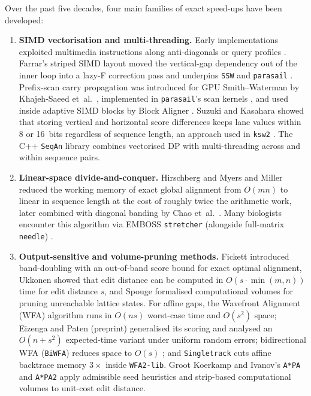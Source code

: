 \documentclass[11pt,a4paper]{article}
\begin{document}
Over the past five decades, four main families of exact speed-ups have been developed:
\begin{enumerate}
  \item \textbf{SIMD vectorisation and multi-threading.} Early implementations exploited multimedia instructions along anti-diagonals \citep{wozniak1997using} or query profiles \citep{rognes2000sixfold}. Farrar's striped SIMD layout \citep{farrar2007striped} moved the vertical-gap dependency out of the inner loop into a lazy-F correction pass and underpins \texttt{SSW} \citep{zhao2013ssw,sswrepo} and \texttt{parasail} \citep{daily2016parasail}. Prefix-scan carry propagation was introduced for GPU Smith--Waterman by Khajeh-Saeed et~al.~\citep{khajehsaeed2010acceleration}, implemented in \texttt{parasail}'s scan kernels \citep{daily2016parasail}, and used inside adaptive SIMD blocks by Block Aligner \citep{liu2023block}. Suzuki and Kasahara \citep{suzuki2018introducing} showed that storing vertical and horizontal score differences keeps lane values within 8 or 16~bits regardless of sequence length, an approach used in \texttt{ksw2} \citep{li2018minimap2,ksw2repo}. The C++ \texttt{SeqAn} library \citep{rahn2018seqan} combines vectorised DP with multi-threading across and within sequence pairs.
  \item \textbf{Linear-space divide-and-conquer.} Hirschberg \citep{hirschberg1975linear} and Myers and Miller \citep{myers1988optimal} reduced the working memory of exact global alignment from $O(mn)$ to linear in sequence length at the cost of roughly twice the arithmetic work, later combined with diagonal banding by Chao et~al.~\citep{chao1992aligning}. Many biologists encounter this algorithm via EMBOSS \texttt{stretcher} (alongside full-matrix \texttt{needle}) \citep{rice2000emboss}.
  \item \textbf{Output-sensitive and volume-pruning methods.} Fickett \citep{fickett1984fast} introduced band-doubling with an out-of-band score bound for exact optimal alignment, Ukkonen \citep{ukkonen1985algorithms} showed that edit distance can be computed in $O(s \cdot \min(m, n))$ time for edit distance $s$, and Spouge \citep{spouge1989speeding} formalised computational volumes for pruning unreachable lattice states. For affine gaps, the Wavefront Alignment (WFA) algorithm \citep{marcosola2021fast,wfa2lib} runs in $O(ns)$ worst-case time and $O(s^2)$ space; Eizenga and Paten (preprint) \citep{eizenga2022improving} generalised its scoring and analysed an $O(n + s^2)$ expected-time variant under uniform random errors; bidirectional WFA (\texttt{BiWFA}) reduces space to $O(s)$ \citep{marcosola2023optimal}; and \texttt{Singletrack} \citep{lopezvillellas2026singletrack} cuts affine backtrace memory $3\times$ inside \texttt{WFA2-lib}. Groot Koerkamp and Ivanov's \texttt{A*PA} \citep{grootkoerkamp2024apa} and \texttt{A*PA2} \citep{grootkoerkamp2024apa2} apply admissible seed heuristics and strip-based computational volumes to unit-cost edit distance.

\end{enumerate}
\end{document}
